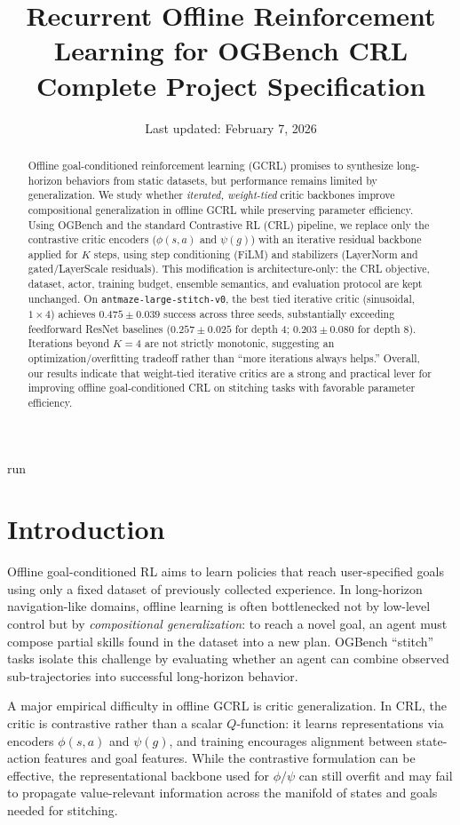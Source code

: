run\documentclass[11pt]{article}
\title{Recurrent Offline Reinforcement Learning for OGBench CRL\\
\large Complete Project Specification}
\author{}
\date{Last updated: February 7, 2026}
\begin{document}
\maketitle


\begin{abstract}
Offline goal-conditioned reinforcement learning (GCRL) promises to synthesize long-horizon behaviors from static datasets, but performance remains limited by generalization. We study whether \emph{iterated, weight-tied} critic backbones improve compositional generalization in offline GCRL while preserving parameter efficiency. Using OGBench and the standard Contrastive RL (CRL) pipeline, we replace only the contrastive critic encoders ($\phi(s,a)$ and $\psi(g)$) with an iterative residual backbone applied for $K$ steps, using step conditioning (FiLM) and stabilizers (LayerNorm and gated/LayerScale residuals). This modification is architecture-only: the CRL objective, dataset, actor, training budget, ensemble semantics, and evaluation protocol are kept unchanged. On \texttt{antmaze-large-stitch-v0}, the best tied iterative critic (sinusoidal, $1\times4$) achieves $0.475 \pm 0.039$ success across three seeds, substantially exceeding feedforward ResNet baselines ($0.257 \pm 0.025$ for depth 4; $0.203 \pm 0.080$ for depth 8). Iterations beyond $K=4$ are not strictly monotonic, suggesting an optimization/overfitting tradeoff rather than ``more iterations always helps.'' Overall, our results indicate that weight-tied iterative critics are a strong and practical lever for improving offline goal-conditioned CRL on stitching tasks with favorable parameter efficiency.
\end{abstract}

\section{Introduction}
Offline goal-conditioned RL aims to learn policies that reach user-specified goals using only a fixed dataset of previously collected experience. In long-horizon navigation-like domains, offline learning is often bottlenecked not by low-level control but by \emph{compositional generalization}: to reach a novel goal, an agent must compose partial skills found in the dataset into a new plan. OGBench ``stitch'' tasks isolate this challenge by evaluating whether an agent can combine observed sub-trajectories into successful long-horizon behavior.

A major empirical difficulty in offline GCRL is critic generalization. In CRL, the critic is contrastive rather than a scalar $Q$-function: it learns representations via encoders $\phi(s,a)$ and $\psi(g)$, and training encourages alignment between state-action features and goal features. While the contrastive formulation can be effective, the representational backbone used for $\phi/\psi$ can still overfit and may fail to propagate value-relevant information across the manifold of states and goals needed for stitching.
\end{document}
